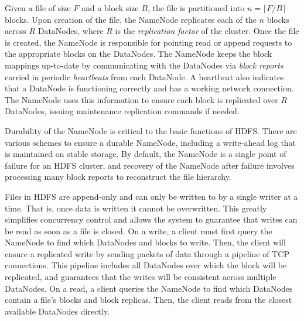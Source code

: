 \documentclass[11pt, a4paper]{article}
\begin{document}
\begin{multicols*}{2}
Given a file of size $F$ and a block size $B$, the file is partitioned into $n = \lceil F/B\rceil$ blocks. Upon creation of the file, the NameNode replicates each of the $n$ blocks across $R$ DataNodes, where $R$ is the \textit{replication factor} of the cluster. Once the file is created, the NameNode is responsible for pointing read or append requests to the appropriate blocks on the DataNodes. The NameNode keeps the block mappings up-to-date by communicating with the DataNodes via \textit{block reports} carried in periodic \textit{heartbeats} from each DataNode. A heartbeat also indicates that a DataNode is functioning correctly and has a working network connection. The NameNode uses this information to ensure each block is replicated over $R$ DataNodes, issuing maintenance replication commands if needed.

Durability of the NameNode is critical to the basic functions of HDFS. There are various schemes to ensure a durable NameNode, including a write-ahead log that is maintained on stable storage. By default, the NameNode is a single point of failure for an HDFS cluster, and recovery of the NameNode after failure involves processing many block reports to reconstruct the file hierarchy.

Files in HDFS are append-only and can only be written to by a single writer at a time. That is, once data is written it cannot be overwritten. This greatly simplifies concurrency control and allows the system to guarantee that writes can be read as soon as a file is closed. On a write, a client must first query the NameNode to find which DataNodes and blocks to write. Then, the client will ensure a replicated write by sending packets of data through a pipeline of TCP connections. This pipeline includes all DataNodes over which the block will be replicated, and guarantees that the writes will be consistent across multiple DataNodes. On a read, a client queries the NameNode to find which DataNodes contain a file's blocks and block replicas. Then, the client reads from the closest available DataNodes directly.


\end{multicols*}
\end{document}
